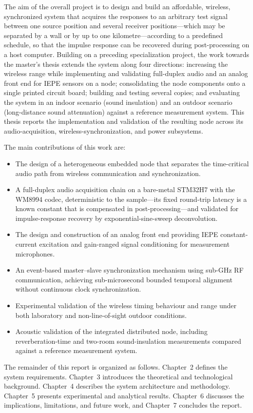 The aim of the overall project is to design and build an affordable, wireless, synchronized system that acquires the responses to an arbitrary test signal between one source position and several receiver positions---which may be separated by a wall or by up to one kilometre---according to a predefined schedule, so that the impulse response can be recovered during post-processing on a host computer. Building on a preceding specialization project, the work towards the master's thesis extends the system along four directions: increasing the wireless range while implementing and validating full-duplex audio and an analog front end for IEPE sensors on a node; consolidating the node components onto a single printed circuit board; building and testing several copies; and evaluating the system in an indoor scenario (sound insulation) and an outdoor scenario (long-distance sound attenuation) against a reference measurement system. This thesis reports the implementation and validation of the resulting node across its audio-acquisition, wireless-synchronization, and power subsystems.

The main contributions of this work are:

\begin{itemize}
  \item The design of a heterogeneous embedded node that separates the time-critical audio path from wireless communication and synchronization.
  \item A full-duplex audio acquisition chain on a bare-metal STM32H7 with the WM8994 codec, deterministic to the sample---its fixed round-trip latency is a known constant that is compensated in post-processing---and validated for impulse-response recovery by exponential-sine-sweep deconvolution.
  \item The design and construction of an analog front end providing IEPE constant-current excitation and gain-ranged signal conditioning for measurement microphones.
  \item An event-based master–slave synchronization mechanism using sub-GHz RF communication, achieving sub-microsecond bounded temporal alignment without continuous clock synchronization.
  \item Experimental validation of the wireless timing behaviour and range under both laboratory and non-line-of-sight outdoor conditions.
  \item Acoustic validation of the integrated distributed node, including reverberation-time and two-room sound-insulation measurements compared against a reference measurement system.
\end{itemize}

The remainder of this report is organized as follows. Chapter~2 defines the system requirements. Chapter~3 introduces the theoretical and technological background. Chapter~4 describes the system architecture and methodology. Chapter~5 presents experimental and analytical results. Chapter~6 discusses the implications, limitations, and future work, and Chapter~7 concludes the report.
